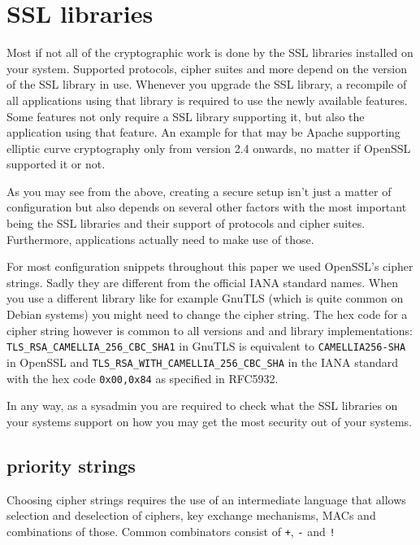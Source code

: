 \section{SSL libraries}
\label{section:ssllibs}


Most if not all of the cryptographic work is done by the SSL libraries installed on
your system. Supported protocols, cipher suites and more depend on the version of
the SSL library in use. Whenever you upgrade the SSL library, a recompile of all
applications using that library is required to use the newly available features.
Some features not only require a SSL library supporting it, but also the application
using that feature. An example for that may be Apache supporting elliptic curve
cryptography only from version 2.4 onwards, no matter if OpenSSL supported it or
not.

As you may see from the above, creating a secure setup isn't just a matter of
configuration but also depends on several other factors with the most important
being the SSL libraries and their support of protocols and cipher suites.
Furthermore, applications actually need to make use of those.

For most configuration snippets throughout this paper we used OpenSSL's cipher
strings. Sadly they are different from the official IANA standard names. When you
use a different library like for example GnuTLS (which is quite common on Debian
systems) you might need to change the cipher string. The hex code for a cipher
string however is common to all versions and and library implementations:
\texttt{TLS\_RSA\_CAMELLIA\_256\_CBC\_SHA1} in GnuTLS is equivalent to
\texttt{CAMELLIA256-SHA} in OpenSSL and \texttt{TLS\_RSA\_WITH\_CAMELLIA\_256\_CBC\_SHA}
in the IANA standard with the hex code \texttt{0x00,0x84} as specified
in RFC5932\cite{rfc5932}.

In any way, as a sysadmin you are required to check what the SSL libraries on
your systems support on how you may get the most security out of your systems.

\subsection{priority strings}

Choosing cipher strings requires the use of an intermediate language that allows selection
and deselection of ciphers, key exchange mechanisms, MACs and combinations of those.
Common combinators consist of \texttt{+}, \texttt{-} and \texttt{!}

